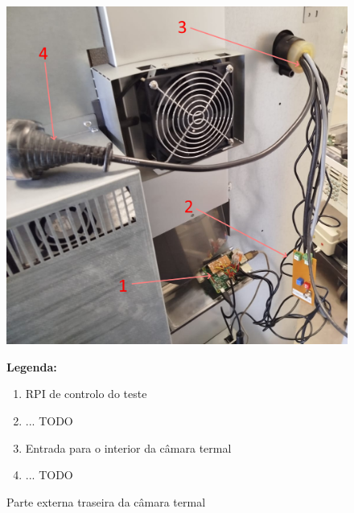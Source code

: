 \begin{figure}[H]
    \centering
    \begin{minipage}{0.6\textwidth}
        \includegraphics[width=\linewidth]{figures/inst_inside_3.png}
    \end{minipage}%
    \hfill
    \begin{minipage}{0.35\textwidth}
        \small
        \textbf{Legenda:}
        \begin{enumerate}
            \item RPI de controlo do teste
            \item ... TODO
            \item Entrada para o interior da câmara termal
            \item ... TODO
        \end{enumerate}
    \end{minipage}
    \caption{Parte externa traseira da câmara termal}
    \label{fig:inst_inside_3}
\end{figure}

